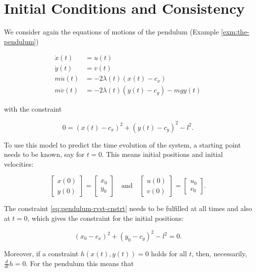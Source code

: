 \documentclass[]{book}
\theoremstyle{definition}
\theoremstyle{definition}
\theoremstyle{definition}
\theoremstyle{remark}
\begin{document}
\hypertarget{initial-conditions-and-consistency}{%
\section{Initial Conditions and Consistency}\label{initial-conditions-and-consistency}}

We consider again the equations of motions of the pendulum (Example \ref{exm:the-pendulum})

\begin{align*}
    \dot x(t) &= u(t) \\
    \dot y(t) &= v(t) \\
    m \dot u(t) &= - 2 \lambda(t) (x(t) - c_x) \\ 
    m \dot v(t) &= - 2 \lambda(t) (y(t) - c_y) - mgy(t)
\end{align*}

with the constraint

\begin{equation}
    0=(x(t) - c_x)^2 + (y(t) - c_y)^2 - l^2. \label{eq:pendulum-rvst-cnstrt}
\end{equation}

To use this model to predict the time evolution of the system, a starting point needs to be known, say for \(t=0\). This means initial positions and initial velocities:

\[
\begin{bmatrix} 
x(0) \\ y(0)
\end{bmatrix}
=
\begin{bmatrix} 
    x_0 \\ y_0
\end{bmatrix}
\quad\text{and}\quad
\begin{bmatrix} 
u(0) \\ v(0)
\end{bmatrix}
=
\begin{bmatrix} 
    u_0 \\ v_0
\end{bmatrix}.
\]

The constraint \eqref{eq:pendulum-rvst-cnstrt} needs to be fulfilled at all times and also at \(t=0\), which gives the constraint for the initial positions:

\begin{equation*}
    (x_0 - c_x)^2 + (y_0 - c_y)^2 - l^2=0.
\end{equation*}

Moreover, if a constraint \(h(x(t), y(t))=0\) holds for all \(t\), then, necessarily, \(\frac{d}{dt}h=0\). For the pendulum this means that
\end{document}
